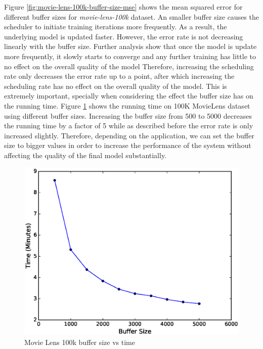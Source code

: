 \documentclass{sig-alternate-05-2015}
\begin{document}
Figure \ref{fig:movie-lens-100k-buffer-size-mse} shows the mean squared error for different buffer sizes for \textit{movie-lens-100k} dataset. 
An smaller buffer size causes the scheduler to initiate training iterations more frequently.
As a result, the underlying model is updated faster.
However, the error rate is not decreasing linearly with the buffer size.
Further analysis show that once the model is update more frequently, it slowly starts to converge and any further training has little to no effect on the overall quality of the model
Therefore, increasing the scheduling rate only decreases the error rate up to a point, after which increasing the scheduling rate has no effect on the overall quality of the model.
This is extremely important, specially when considering the effect the buffer size has on the running time.
Figure \ref{fig:movie-lens-100k-buffer-size-time} shows the running time on 100K MovieLens dataset using different buffer sizes. 
Increasing the buffer size from 500 to 5000 decreases the running time by a factor of 5 while as described before the error rate is only increased slightly.
Therefore, depending on the application, we can set the buffer size to bigger values in order to increase the performance of the system without affecting the quality of the final model substantially.

\begin{figure}[H]
\centering
\includegraphics[width=\columnwidth]{../images/experiment-results/movie-lens-100k-buffer-time.eps}
\caption{Movie Lens 100k buffer size vs time}
\label{fig:movie-lens-100k-buffer-size-time}
\end{figure}
\end{document}
